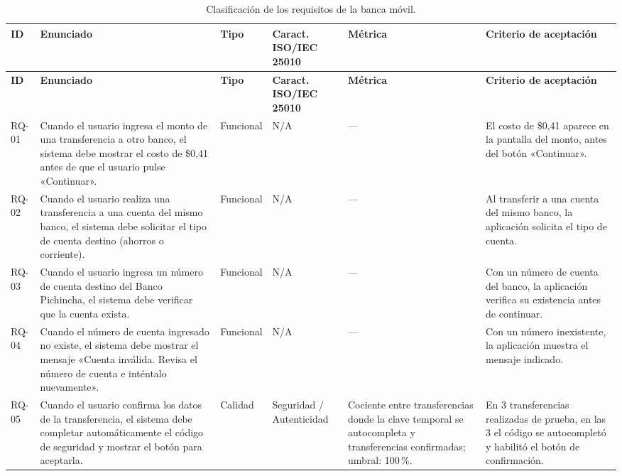 \documentclass[11pt,a4paper]{article}
\begin{document}
{\footnotesize
\setlength{\tabcolsep}{3pt}
\renewcommand{\arraystretch}{1.25}
\begin{longtable}{>{\raggedright\arraybackslash}p{1.2cm}
                  >{\raggedright\arraybackslash}p{4.6cm}
                  >{\raggedright\arraybackslash}p{1.7cm}
                  >{\raggedright\arraybackslash}p{2.1cm}
                  >{\raggedright\arraybackslash}p{2.3cm}
                  >{\raggedright\arraybackslash}p{3.2cm}}
\caption{Clasificación de los requisitos de la banca móvil.}\label{tab:requisitos}\\
\toprule
\textbf{ID} & \textbf{Enunciado} & \textbf{Tipo} & \textbf{Caract. ISO/IEC 25010} & \textbf{Métrica} & \textbf{Criterio de aceptación}\\
\midrule
\endfirsthead
\toprule
\textbf{ID} & \textbf{Enunciado} & \textbf{Tipo} & \textbf{Caract. ISO/IEC 25010} & \textbf{Métrica} & \textbf{Criterio de aceptación}\\
\midrule
\endhead
RQ-01 & Cuando el usuario ingresa el monto de una transferencia a otro banco, el sistema debe mostrar el costo de \$0{,}41 antes de que el usuario pulse «Continuar». & Funcional & N/A & --- & El costo de \$0{,}41 aparece en la pantalla del monto, antes del botón «Continuar».\\
RQ-02 & Cuando el usuario realiza una transferencia a una cuenta del mismo banco, el sistema debe solicitar el tipo de cuenta destino (ahorros o corriente). & Funcional & N/A & --- & Al transferir a una cuenta del mismo banco, la aplicación solicita el tipo de cuenta.\\
RQ-03 & Cuando el usuario ingresa un número de cuenta destino del Banco Pichincha, el sistema debe verificar que la cuenta exista. & Funcional & N/A & --- & Con un número de cuenta del banco, la aplicación verifica su existencia antes de continuar.\\
RQ-04 & Cuando el número de cuenta ingresado no existe, el sistema debe mostrar el mensaje «Cuenta inválida. Revisa el número de cuenta e inténtalo nuevamente». & Funcional & N/A & --- & Con un número inexistente, la aplicación muestra el mensaje indicado.\\
RQ-05 & Cuando el usuario confirma los datos de la transferencia, el sistema debe completar automáticamente el código de seguridad y mostrar el botón para aceptarla. & Calidad & Seguridad / Autenticidad & Cociente entre transferencias donde la clave temporal se autocompleta y transferencias confirmadas; umbral: 100\,\%. & En 3 transferencias realizadas de prueba, en las 3 el código se autocompletó y habilitó el botón de confirmación.\\

\end{longtable}}
\end{document}

